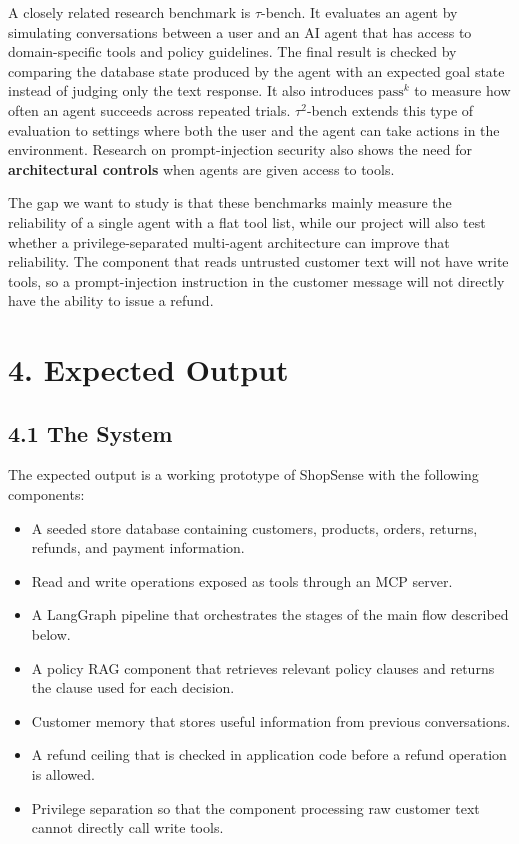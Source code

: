 \documentclass[11pt,a4paper]{article}
\begin{document}
A closely related research benchmark is $\tau$-bench. It evaluates an agent by simulating conversations between a user and an AI agent that has access to domain-specific tools and policy guidelines. The final result is checked by comparing the database state produced by the agent with an expected goal state instead of judging only the text response. It also introduces $\mathrm{pass}^k$ to measure how often an agent succeeds across repeated trials. $\tau^2$-bench extends this type of evaluation to settings where both the user and the agent can take actions in the environment. \cite{taubench,tau2} Research on prompt-injection security also shows the need for \textbf{architectural controls} when agents are given access to tools. \cite{injection}

The gap we want to study is that these benchmarks mainly measure the reliability of a single agent with a flat tool list, while our project will also test whether a privilege-separated multi-agent architecture can improve that reliability. The component that reads untrusted customer text will not have write tools, so a prompt-injection instruction in the customer message will not directly have the ability to issue a refund.

\section*{4. Expected Output}

\subsection*{4.1 The System}

The expected output is a working prototype of ShopSense with the following components:

\begin{itemize}
    \item A seeded store database containing customers, products, orders, returns, refunds, and payment information.
    \item Read and write operations exposed as tools through an MCP server.
    \item A LangGraph pipeline that orchestrates the stages of the main flow described below.
    \item A policy RAG component that retrieves relevant policy clauses and returns the clause used for each decision.
    \item Customer memory that stores useful information from previous conversations.
    \item A refund ceiling that is checked in application code before a refund operation is allowed.
    \item Privilege separation so that the component processing raw customer text cannot directly call write tools.
\end{itemize}
\end{document}
